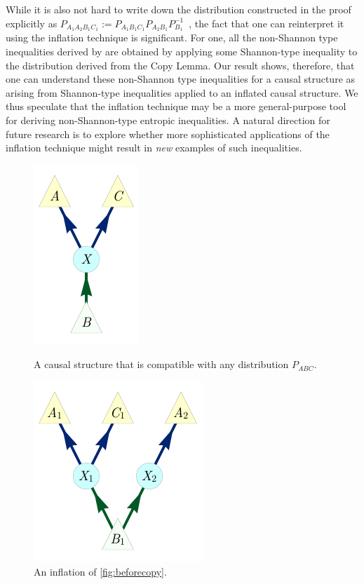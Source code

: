 \documentclass[aps,english,10pt,superscriptaddress,onecolumn,twoside,longbibliography,pra,floatfix,fleqn,nofootinbib]{revtex4-1}
\theoremstyle{definition}
\newcounter{example}[section]
\begin{document}
While it is also not hard to write down the distribution constructed in the proof explicitly as $P_{A_1 A_2 B_1 C_1} := P_{A_1 B_1 C_1} P_{A_2 B_1} P_{B_1}^{-1}$~\cite[Lemma~15.8]{yeung_network_2008}, the fact that one can reinterpret it using the inflation technique is significant.  For one, all the non-Shannon type inequalities derived by \citet{zeger_2011_nonshannon} are obtained by applying some Shannon-type inequality to the distribution derived from the Copy Lemma.  Our result shows, therefore, that one can understand these non-Shannon type inequalities for a causal structure as arising from Shannon-type inequalities applied to an inflated causal structure. We thus speculate that the inflation technique may be a more general-purpose tool for deriving non-Shannon-type entropic inequalities.  A natural direction for future research is to explore whether more sophisticated applications of the inflation technique might result  in \emph{new} examples of such inequalities. 

\begin{figure}[H]
\centering
\begin{minipage}[t]{0.4\linewidth}
\centering
\includegraphics[scale=1]{shannonNOcopyV1.pdf}
\caption{A causal structure that is compatible with any distribution $P_{ABC}$.}\label{fig:beforecopy}
\end{minipage}
\hfill
\begin{minipage}[t]{0.4\linewidth}
\centering
\includegraphics[scale=1]{shannonYEScopyV1.pdf}
\caption{An inflation of \cref{fig:beforecopy}.}\label{fig:aftercopy}
\end{minipage}
\end{figure}
\end{document}
